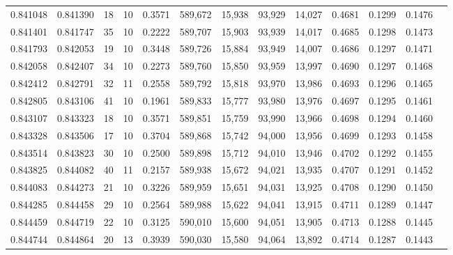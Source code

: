\begin{tabular}{rrrrrrrrrrrrr}
0.841048 & 0.841390 &    18 &  10 &                                     0.3571 & 589,672 &  15,938 &  93,929 &  14,027 & 0.4681 & 0.1299 & 0.1476 \\
0.841401 & 0.841747 &    35 &  10 &                                     0.2222 & 589,707 &  15,903 &  93,939 &  14,017 & 0.4685 & 0.1298 & 0.1473 \\
0.841793 & 0.842053 &    19 &  10 &                                     0.3448 & 589,726 &  15,884 &  93,949 &  14,007 & 0.4686 & 0.1297 & 0.1471 \\
0.842058 & 0.842407 &    34 &  10 &                                     0.2273 & 589,760 &  15,850 &  93,959 &  13,997 & 0.4690 & 0.1297 & 0.1468 \\
0.842412 & 0.842791 &    32 &  11 &                                     0.2558 & 589,792 &  15,818 &  93,970 &  13,986 & 0.4693 & 0.1296 & 0.1465 \\
0.842805 & 0.843106 &    41 &  10 &                                     0.1961 & 589,833 &  15,777 &  93,980 &  13,976 & 0.4697 & 0.1295 & 0.1461 \\
0.843107 & 0.843323 &    18 &  10 &                                     0.3571 & 589,851 &  15,759 &  93,990 &  13,966 & 0.4698 & 0.1294 & 0.1460 \\
0.843328 & 0.843506 &    17 &  10 &                                     0.3704 & 589,868 &  15,742 &  94,000 &  13,956 & 0.4699 & 0.1293 & 0.1458 \\
0.843514 & 0.843823 &    30 &  10 &                                     0.2500 & 589,898 &  15,712 &  94,010 &  13,946 & 0.4702 & 0.1292 & 0.1455 \\
0.843825 & 0.844082 &    40 &  11 &                                     0.2157 & 589,938 &  15,672 &  94,021 &  13,935 & 0.4707 & 0.1291 & 0.1452 \\
0.844083 & 0.844273 &    21 &  10 &                                     0.3226 & 589,959 &  15,651 &  94,031 &  13,925 & 0.4708 & 0.1290 & 0.1450 \\
0.844285 & 0.844458 &    29 &  10 &                                     0.2564 & 589,988 &  15,622 &  94,041 &  13,915 & 0.4711 & 0.1289 & 0.1447 \\
0.844459 & 0.844719 &    22 &  10 &                                     0.3125 & 590,010 &  15,600 &  94,051 &  13,905 & 0.4713 & 0.1288 & 0.1445 \\
0.844744 & 0.844864 &    20 &  13 &                                     0.3939 & 590,030 &  15,580 &  94,064 &  13,892 & 0.4714 & 0.1287 & 0.1443 \\

\end{tabular}
